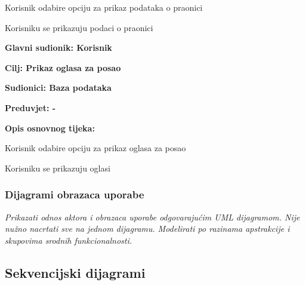 \begin{packed_item}
\begin{packed_item}
						\item[] \begin{packed_enum}
							
							\item Korisnik odabire opciju za prikaz podataka o praonici
							\item Korisniku se prikazuju podaci o praonici
			
						\end{packed_enum}
						
					\end{packed_item}
				
					\noindent {}
					\begin{packed_item}
						
						\item \textbf{Glavni sudionik: Korisnik}
						\item  \textbf{Cilj: Prikaz oglasa za posao}
						\item  \textbf{Sudionici: Baza podataka}
						\item  \textbf{Preduvjet: -}
						\item  \textbf{Opis osnovnog tijeka:}
						
						\item[] \begin{packed_enum}
							
							\item Korisnik odabire opciju za prikaz oglasa za posao
							\item Korisniku se prikazuju oglasi
							
						\end{packed_enum}
						
					\end{packed_item}
					
				\end{packed_item}
					
				\subsubsection{Dijagrami obrazaca uporabe}
					
					\textit{Prikazati odnos aktora i obrazaca uporabe odgovarajućim UML dijagramom. Nije nužno nacrtati sve na jednom dijagramu. Modelirati po razinama apstrakcije i skupovima srodnih funkcionalnosti.}
				\eject		
				
			\subsection{Sekvencijski dijagrami}
				
